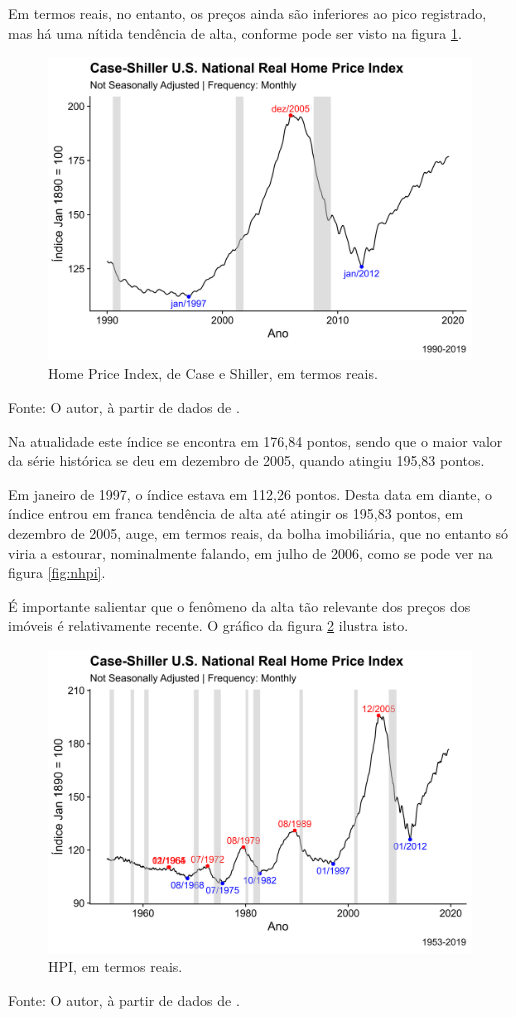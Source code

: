 \documentclass[
	12pt,				%
	oneside,			%
	a4paper,			%
	chapter=TITLE,		%
	section=TITLE,		%
	english,			%
	brazil				%
	]{abntex2}
\newcommand{\bcenter}{\begin{center}}
\newcommand{\ecenter}{\end{center}}
\begin{document}
Em termos reais, no entanto, os preços ainda são inferiores ao pico
registrado, mas há uma nítida tendência de alta, conforme pode ser visto
na figura \ref{fig:rhpi}.
\begin{figure}[H]

{\centering \includegraphics[width=0.7\linewidth]{images/rhpi-1} 

}

\caption{Home Price Index, de Case e Shiller, em termos reais.}\label{fig:rhpi}
\end{figure}
\bcenter
Fonte: O autor, à partir de dados de \textcite{QuandlWIKI}. \ecenter

Na atualidade este índice se encontra em 176,84 pontos, sendo que o
maior valor da série histórica se deu em dezembro de 2005, quando
atingiu 195,83 pontos.

Em janeiro de 1997, o índice estava em 112,26 pontos. Desta data em
diante, o índice entrou em franca tendência de alta até atingir os
195,83 pontos, em dezembro de 2005, auge, em termos reais, da bolha
imobiliária, que no entanto só viria a estourar, nominalmente falando,
em julho de 2006, como se pode ver na figura \ref{fig:nhpi}.

É importante salientar que o fenômeno da alta tão relevante dos preços
dos imóveis é relativamente recente. O gráfico da figura \ref{fig:rhpi2}
ilustra isto.
\begin{figure}[H]

{\centering \includegraphics[width=0.7\linewidth]{images/rhpi2-1} 

}

\caption{HPI, em termos reais.}\label{fig:rhpi2}
\end{figure}
\bcenter
Fonte: O autor, à partir de dados de \textcite{QuandlWIKI}. \ecenter
\end{document}
